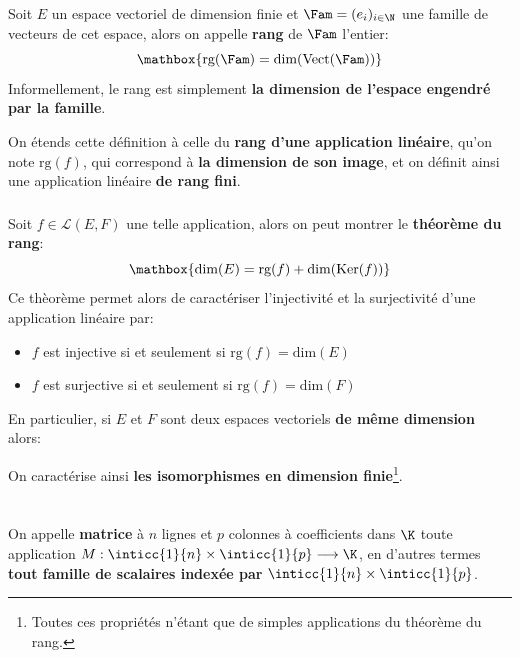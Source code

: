 Soit \(E\) un espace vectoriel de dimension finie et \(\Fam = (e_i)_{i \in \N}\) une famille de vecteurs de cet espace, alors on appelle \textbf{rang} de \(\Fam\) l'entier:
\[
   \mathbox{\text{rg}(\Fam) = \text{dim}(\text{Vect}(\Fam))}   
\]
Informellement, le rang est simplement \textbf{la dimension de l'espace engendré par la famille}.\<

On étends cette définition à celle du \textbf{rang d'une application linéaire}, qu'on note \(\text{rg}(f)\), qui correspond à \textbf{la dimension de son image}, et on définit ainsi une application linéaire \textbf{de rang fini}.

\subsection*{}

Soit \(f \in \mathcal{L}(E, F)\) une telle application, alors on peut montrer le \textbf{théorème du rang}:
\[
   \mathbox{\text{dim}(E) = \text{rg}(f) + \text{dim}(\text{Ker}(f))}
\]
Ce thèorème permet alors de caractériser l'injectivité et la surjectivité d'une application linéaire par:
\begin{itemize}
   \item \(f\) est injective si et seulement si \(\text{rg}(f) = \text{dim}(E)\)
   \item \(f\) est surjective si et seulement si \(\text{rg}(f) = \text{dim}(F)\)
\end{itemize}

En particulier, si \(E\) et \(F\) sont deux espaces vectoriels \textbf{de même dimension} alors:
\begin{center}
\end{center}
On caractérise ainsi \textbf{les isomorphismes en dimension finie}\footnote[2]{Toutes ces propriétés n'étant que de simples applications du théorème du rang.}.

\chapter*{} %

On appelle \textbf{matrice} à \(n\) lignes et \(p\) colonnes à coefficients dans \(\K\) toute application \(M : \inticc{1}{n} \times \inticc{1}{p} \longrightarrow \K\), en d'autres termes \textbf{tout famille de scalaires indexée par }\(\inticc{1}{n} \times \inticc{1}{p}\).\<

